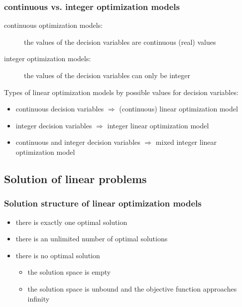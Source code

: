 \begin{frame}
 \frametitle{continuous vs. integer optimization models}
 \begin{description}
  \item[continuous optimization models:] the values of the decision variables are continuous (real) values
  \item[integer optimization models:] the values of the decision variables can only be integer
 \end{description}
 
 \begin{block}{Types of linear optimization models by possible values for decision variables:}
  \begin{itemize}\footnotesize
   \item continuous decision variables $\Longrightarrow$ (continuous) linear optimization model
   \item integer decision variables $\Longrightarrow$ integer linear optimization model
   \item continuous and integer decision variables $\Longrightarrow$ mixed integer linear optimization model
  \end{itemize}
 \end{block}
\end{frame}

\subsection{Solution of linear problems}

\begin{frame}
 \frametitle{Solution structure of linear optimization models}
 \begin{itemize}
  \item there is exactly one optimal solution
  \item there is an unlimited number of optimal solutions
  \item there is no optimal solution
  \begin{itemize}
   \item the solution space is empty
   \item the solution space is unbound and the objective function approaches infinity
  \end{itemize}
 \end{itemize}
\end{frame}


